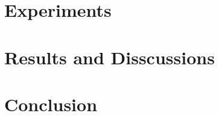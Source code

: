 \documentclass{article}
\begin{document}
\section{Experiments}



\section{Results and Disscussions}


\section{Conclusion}





\end{document}
